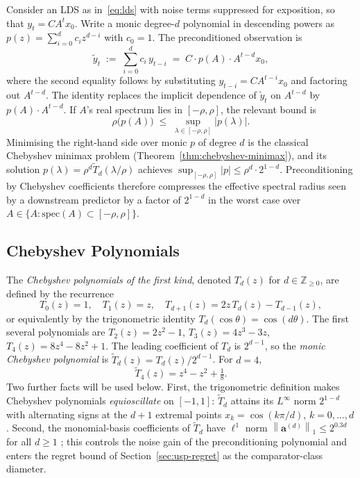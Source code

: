 \documentclass[11pt]{article}
\theoremstyle{plain}
\theoremstyle{definition}
\theoremstyle{remark}
\newcommand{\Z}{\mathbb{Z}}
\newcommand{\norm}[1]{\left\lVert#1\right\rVert}
\newcommand{\abs}[1]{\left\lvert#1\right\rvert}
\begin{document}
Consider an LDS as in~\eqref{eq:lds} with noise terms suppressed for exposition, so that $y_t = C A^t x_0$. Write a monic degree-$d$ polynomial in descending powers as $p(z) = \sum_{i=0}^{d} c_i z^{d-i}$ with $c_0 = 1$. The preconditioned observation is
\begin{equation}
    \tilde y_t \;:=\; \sum_{i=0}^{d} c_i\, y_{t-i} \;=\; C \cdot p(A) \cdot A^{t-d} x_0,
    \label{eq:mh-identity}
\end{equation}
where the second equality follows by substituting $y_{t-i} = C A^{t-i} x_0$ and factoring out $A^{t-d}$. The identity replaces the implicit dependence of $\tilde y_t$ on $A^{t-d}$ by $p(A) \cdot A^{t-d}$. If $A$'s real spectrum lies in $[-\rho, \rho]$, the relevant bound is
\begin{equation}
    \rho\big( p(A) \big) \;\leq\; \sup_{\lambda \in [-\rho,\rho]} \abs{p(\lambda)}.
    \label{eq:rho-bound}
\end{equation}
Minimising the right-hand side over monic $p$ of degree $d$ is the classical Chebyshev minimax problem (Theorem~\ref{thm:chebyshev-minimax}), and its solution $p(\lambda) = \rho^d \tilde T_d(\lambda/\rho)$ achieves $\sup_{[-\rho,\rho]} \abs{p} \leq \rho^d \cdot 2^{1-d}$. Preconditioning by Chebyshev coefficients therefore compresses the effective spectral radius seen by a downstream predictor by a factor of $2^{1-d}$ in the worst case over $A \in \{A : \mathrm{spec}(A) \subset [-\rho,\rho]\}$.



\subsection{Chebyshev Polynomials}
\label{sec:chebyshev-prelim}

The \emph{Chebyshev polynomials of the first kind}, denoted $T_d(z)$ for $d \in \Z_{\geq 0}$, are defined by the recurrence
\begin{equation}
    T_0(z) = 1, \quad T_1(z) = z, \quad T_{d+1}(z) = 2 z \, T_d(z) - T_{d-1}(z),
    \label{eq:cheb-recurrence}
\end{equation}
or equivalently by the trigonometric identity $T_d(\cos \theta) = \cos(d \theta)$. The first several polynomials are $T_2(z) = 2z^2 - 1$, $T_3(z) = 4z^3 - 3z$, $T_4(z) = 8z^4 - 8z^2 + 1$. The leading coefficient of $T_d$ is $2^{d-1}$, so the \emph{monic Chebyshev polynomial} is $\tilde T_d(z) = T_d(z) / 2^{d-1}$. For $d = 4$,
\[
    \tilde T_4(z) = z^4 - z^2 + \tfrac{1}{8}.
\]
Two further facts will be used below. First, the trigonometric definition makes Chebyshev polynomials \emph{equioscillate} on $[-1,1]$: $\tilde T_d$ attains its $L^\infty$ norm $2^{1-d}$ with alternating signs at the $d{+}1$ extremal points $x_k = \cos(k\pi/d)$, $k = 0, \ldots, d$. Second, the monomial-basis coefficients of $\tilde T_d$ have $\ell^1$ norm $\norm{\boldsymbol{a}^{(d)}}_1 \leq 2^{0.3d}$ for all $d \geq 1$ \citep[Lem.~3.2]{marsden2024universal}; this controls the noise gain of the preconditioning polynomial and enters the regret bound of Section~\ref{sec:usp-regret} as the comparator-class diameter.
\end{document}
